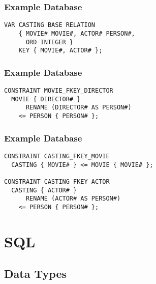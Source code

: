 \documentclass[dvipsnames]{beamer}
\theoremstyle{plain}
\begin{document}
\begin{frame}[fragile]
  \frametitle{Example Database}

  \begin{example}
    \begin{lstlisting}
VAR CASTING BASE RELATION
    { MOVIE# MOVIE#, ACTOR# PERSON#,
      ORD INTEGER }
    KEY { MOVIE#, ACTOR# };
    \end{lstlisting}
  \end{example}
\end{frame}

\begin{frame}[fragile]
  \frametitle{Example Database}

  \begin{example}
    \begin{lstlisting}
CONSTRAINT MOVIE_FKEY_DIRECTOR
  MOVIE { DIRECTOR# }
      RENAME (DIRECTOR# AS PERSON#)
    <= PERSON { PERSON# };
    \end{lstlisting}
  \end{example}
\end{frame}

\begin{frame}[fragile]
  \frametitle{Example Database}

  \begin{example}
    \begin{lstlisting}
CONSTRAINT CASTING_FKEY_MOVIE
  CASTING { MOVIE# } <= MOVIE { MOVIE# };

CONSTRAINT CASTING_FKEY_ACTOR
  CASTING { ACTOR# }
      RENAME (ACTOR# AS PERSON#)
    <= PERSON { PERSON# };
    \end{lstlisting}
  \end{example}
\end{frame}

\lstset{language=FullSQL}

\section{SQL}

\subsection{Data Types}
\end{document}
